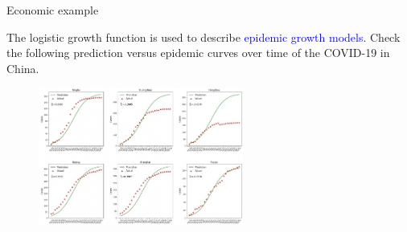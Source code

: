 \documentclass[11pt,aspectratio=169]{beamer}
\begin{document}
\begin{frame}{Economic example}

The logistic growth function is used to describe \textcolor{blue}{epidemic growth models}.  Check the following prediction versus epidemic curves over time of the  COVID-19 in China.

\begin{figure}
\includegraphics[width=0.60\textwidth]{img/figure}
\end{figure}
\end{frame}
\end{document}
